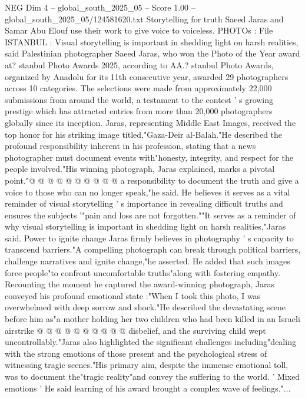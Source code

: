 \begin{textsample}{NEG Dim 4 – global\_south\_2025\_05 – Score 1.00 – global\_south\_2025\_05/124581620.txt}  \label{ex:f4_neg_370}
Storytelling for truth Saeed Jaras and Samar Abu Elouf use their work to give voice to voiceless.
PHOTOs : File ISTANBUL : Visual storytelling is important in shedding light on harsh realities, said Palestinian photographer Saeed Jaras, who won the Photo of the Year award at? stanbul Photo Awards 2025, according to AA.? stanbul Photo Awards, organized by Anadolu for its 11th consecutive year, awarded 29 photographers across 10 categories.
The selections were made from approximately 22,000 submissions from around the world, a testament to the contest ' s growing prestige which has attracted entries from more than 20,000 photographers globally since its inception.
Jaras, representing Middle East Images, received the top honor for his striking image titled,"Gaza-Deir al-Balah."He described the profound responsibility inherent in his profession, stating that a news photographer must document events with"honesty, integrity, and respect for the people involved."His winning photograph, Jaras explained, marks a pivotal point."@ @ @ @ @ @ @ @ @ @ a responsibility to document the truth and give a voice to those who can no longer speak,"he said.
He believes it serves as a vital reminder of visual storytelling ' s importance in revealing difficult truths and ensures the subjects '"pain and loss are not forgotten.""It serves as a reminder of why visual storytelling is important in shedding light on harsh realities,"Jaras said.
Power to ignite change Jaras firmly believes in photography ' s capacity to transcend barriers."A compelling photograph can break through political barriers, challenge narratives and ignite change,"he asserted.
He added that such images force people"to confront uncomfortable truths"along with fostering empathy.
Recounting the moment he captured the award-winning photograph, Jaras conveyed his profound emotional state :"When I took this photo, I was overwhelmed with deep sorrow and shock."He described the devastating scene before him as"a mother holding her two children who had been killed in an Israeli airstrike @ @ @ @ @ @ @ @ @ @ disbelief, and the surviving child wept uncontrollably."Jaras also highlighted the significant challenges including"dealing with the strong emotions of those present and the psychological stress of witnessing tragic scenes."His primary aim, despite the immense emotional toll, was to document the"tragic reality"and convey the suffering to the world. ' Mixed emotions ' He said learning of his award brought a complex wave of feelings."...

\end{textsample}
